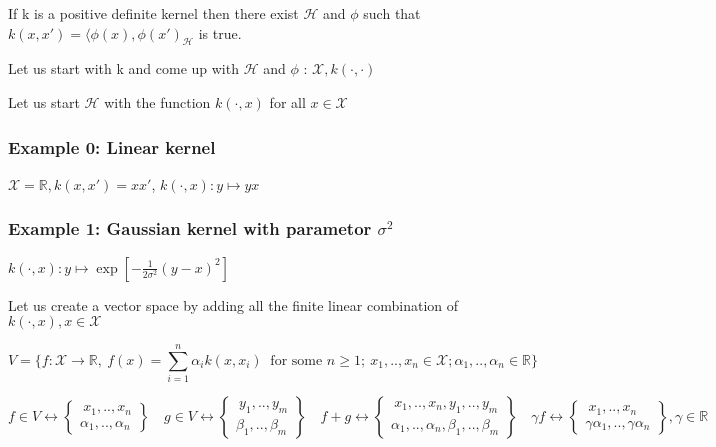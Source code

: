 \documentclass[10pt,portrait]{article}
\begin{document}
If k is a positive definite kernel then there exist \(\mathcal{H}\) and
\(\phi\) such that \(k(x,x')=\langle\phi(x),\phi(x')_{\mathcal{H}}\) is
true.

Let us start with k and come up with \(\mathcal{H}\) and \(\phi\) :
\(\mathcal{X}, k(\cdot,\cdot)\)

Let us start \(\mathcal{H}\) with the function \(k(\cdot,x)\) for all
\(x\in\mathcal{X}\)

\hypertarget{example-0-linear-kernel-1}{%
\subsubsection{Example 0: Linear
kernel}\label{example-0-linear-kernel-1}}

\(\mathcal{X}=\mathbb{R}, k(x,x')=xx'\), \(k(\cdot,x): y\mapsto yx\)

\hypertarget{example-1-gaussian-kernel-with-parametor-sigma2}{%
\subsubsection{\texorpdfstring{Example 1: Gaussian kernel with parametor
\(\sigma^2\)}{Example 1: Gaussian kernel with parametor \textbackslash{}sigma\^{}2}}\label{example-1-gaussian-kernel-with-parametor-sigma2}}

\(k(\cdot,x): y\mapsto \exp[-\frac1{2\sigma^2}(y-x)^2]\)

Let us create a vector space by adding all the finite linear combination
of \(k(\cdot,x),x\in\mathcal{X}\)

\[V=\{f:\mathcal{X}\to\mathbb{R},\ f(x)=\sum_{i=1}^n\alpha_ik(x,x_i)\ \text{  for some  } n\ge1;\ x_1,..,x_n\in\mathcal{X};\alpha_1,..,\alpha_n\in\mathbb{R}\}\]

\[f\in V\leftrightarrow\begin{Bmatrix}\ x_1,..,x_n\\\alpha_1,..,\alpha_n\end{Bmatrix}\quad 
  g\in V\leftrightarrow\begin{Bmatrix}\ y_1,..,y_m\\\beta_1,..,\beta_m\end{Bmatrix}\quad 
  f+g\leftrightarrow\begin{Bmatrix}\ x_1,..,x_n,y_1,..,y_m\\\alpha_1,..,\alpha_n,\beta_1,..,\beta_m\end{Bmatrix}\quad 
  \gamma f\leftrightarrow\begin{Bmatrix}\ x_1,..,x_n\\\gamma\alpha_1,..,\gamma\alpha_n\end{Bmatrix},\gamma\in\mathbb{R}\]
\end{document}
